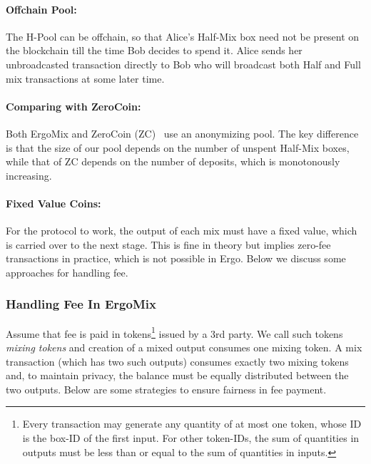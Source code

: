 \documentclass[11pt]{article}
\newcommand{\mixname}{ErgoMix\xspace}
\begin{document}
\paragraph{Offchain Pool:} The H-Pool can be offchain, so that Alice's Half-Mix box need not be present on the blockchain till the time Bob decides to spend it. Alice sends her unbroadcasted transaction directly to Bob who will broadcast both Half and Full mix transactions at some later time. 


\paragraph{Comparing with ZeroCoin:} Both \mixname and ZeroCoin (ZC)~\cite{zerocoin} use an anonymizing pool. The key difference is that the size of our pool depends on the number of unspent Half-Mix boxes, while that of ZC depends on the number of deposits, which is monotonously increasing. 

\paragraph{Fixed Value Coins:} 
For the protocol to work, the output of each mix must have a fixed value, which is carried over to the next stage.
This is fine in theory but implies zero-fee transactions in practice, which is not possible in Ergo. Below we discuss some approaches for handling fee. 

\subsubsection{Handling Fee In \mixname}
Assume that fee is paid in tokens\footnote{Every transaction may generate any quantity of at most one token, whose ID is the box-ID of the first input. For other token-IDs, the sum of quantities in outputs must be less than or equal to the sum of quantities in inputs.} issued by a 3rd party. We call such tokens {\em mixing tokens} and creation of a mixed output consumes one mixing token. A mix transaction (which has two such outputs) consumes exactly two mixing tokens and, to maintain privacy, the balance must be equally distributed between the two outputs. Below are some strategies to ensure fairness in fee payment. 
\end{document}
